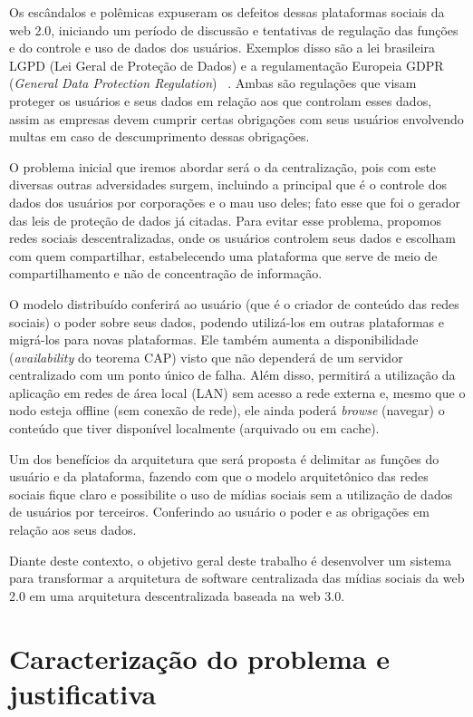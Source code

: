 Os escândalos e polêmicas expuseram os defeitos dessas plataformas sociais da web 2.0, iniciando um período de discussão e tentativas de regulação das funções e do controle e uso de dados dos usuários.
Exemplos disso são a lei brasileira LGPD (Lei Geral de Proteção de Dados) e a regulamentação Europeia GDPR (\textit{General Data Protection Regulation})~\cite{LGPD1} \cite{GPDR1}.
Ambas são regulações que visam proteger os usuários e seus dados em relação aos que controlam esses dados, assim as empresas devem cumprir certas obrigações com seus usuários envolvendo multas em caso de descumprimento dessas obrigações.

O problema inicial que iremos abordar será o da centralização, pois com este diversas outras adversidades surgem, incluindo a principal que é o controle dos dados dos usuários por corporações e o mau uso deles; fato esse que foi o gerador das leis de proteção de dados já citadas.
Para evitar esse problema, propomos redes sociais descentralizadas, onde os usuários controlem seus dados e escolham com quem compartilhar, estabelecendo uma plataforma que serve de meio de compartilhamento e não de concentração de informação.

O modelo distribuído conferirá ao usuário (que é o criador de conteúdo das redes sociais) o poder sobre seus dados, podendo utilizá-los em outras plataformas e migrá-los para novas plataformas.
Ele também aumenta a disponibilidade (\textit{availability} do teorema CAP) visto que não dependerá de um servidor centralizado com um ponto único de falha.
Além disso, permitirá a utilização da aplicação em redes de área local (LAN) sem acesso a rede externa e, mesmo que o nodo esteja offline (sem conexão de rede), ele ainda poderá \textit{browse} (navegar) o conteúdo que tiver disponível localmente (arquivado ou em cache).

Um dos benefícios da arquitetura que será proposta é delimitar as funções do usuário e da plataforma, fazendo com que o modelo arquitetônico das redes sociais fique claro e possibilite o uso de mídias sociais sem a utilização de dados de usuários por terceiros.
Conferindo ao usuário o poder e as obrigações em relação aos seus dados.

Diante deste contexto, o objetivo geral deste trabalho é desenvolver um sistema para transformar a arquitetura de software centralizada das mídias sociais da web 2.0 em uma arquitetura descentralizada baseada na web 3.0.

\chapter{\label{chap:problem}Caracterização do problema e justificativa}

